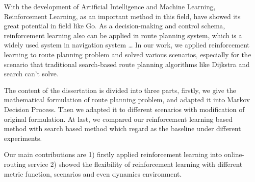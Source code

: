 \documentclass{standalone}
\begin{document}
\begin{englishabstract}
    With the development of Artificial Intelligence and Machine Learning, Reinforcement Learning, as an important method in this field, have showed its great potential in field like Go. As a decision-making and control schema, reinforcement learning also can be applied in route planning system, which is a widely used system in navigation system … In our work, we applied reinforcement learning to route planning problem and solved various scenarios, especially for the scenario that traditional search-based route planning algorithms like Dijkstra and  search can’t solve. 
    
    The content of the dissertation is divided into three parts, firstly, we give the mathematical formulation of route planning problem, and adapted it into Markov Decision Process. Then we adapted it to different scenarios with modification of original formulation. At last, we compared our reinforcement learning based method with search based method which regard as the baseline under different experiments.
    
    Our main contributions are 1) firstly applied reinforcement learning into online-routing service 2) showed the flexibility of reinforcement learning with different metric function, scenarios and even dynamics environment.

\end{englishabstract}
\end{document}
